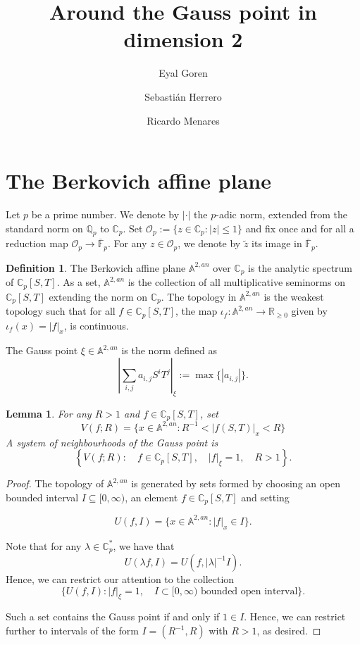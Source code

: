 \documentclass[a4paper,11pt]{amsart}
\title{Around the Gauss point in dimension 2}
\author{Eyal Goren}
\author{Sebasti\'an Herrero}
\author{Ricardo Menares}
\newcommand{\Fpbar}{\overline{\mathbb{F}}_p}
\newcommand{\ce}{\mathbb{C}}
\newcommand{\erre}{\mathbb{R}}
\newcommand{\q}{\mathbb{Q}}
\newcommand{\Aan}{\mathbb{A}^{2,an}}
\newcommand{\Oo}{\mathcal{O}}
\newtheorem{lema}[thm]{Lemma}
\theoremstyle{definition}
\newtheorem{definicion}[thm]{Definition}
\begin{document}
\maketitle

\tableofcontents

\section{The Berkovich affine plane}

Let $p$ be a prime number. We denote by $|\cdot|$ the $p$-adic norm, extended from the standard norm on $\q_p$ to $\ce_p$. Set $\Oo_p:=\{ z \in \ce_p : |z|\leq 1\}$ and fix once and for all a reduction map $\Oo_p\rightarrow \Fpbar$. For any $z\in \Oo_p$, we denote by $\tilde{z}$ its image in $\Fpbar$.

\begin{definicion}
The Berkovich affine plane $\Aan$ over $\ce_p$ is the analytic spectrum of $\ce_p[S,T]$. As a set, $\Aan$ is the collection of all multiplicative seminorms on $\ce_p[S,T]$ extending the norm on $\ce_p$. The topology in $\Aan$ is the weakest topology such that for all $f\in \ce_p[S,T]$, the map $\iota_f : \Aan \rightarrow \erre_{\geq 0}$ given by $\iota_f(x)=|f|_x$, is continuous.

The Gauss point $\xi \in \Aan$ is the norm defined as $$\left| \sum_{i,j}a_{i,j}S^iT^j\right|_\xi := \max\{|a_{i,j}|\}.$$ 
\end{definicion}


\begin{lema}\label{vecindades}
For any $R>1$ and $f\in \ce_p[S,T]$, set $$V(f;R)=\{ x \in \Aan : R^{-1}<|f(S,T)|_x<R\}$$
A system of neighbourhoods of the Gauss point is $$\left\{V(f;R) : \quad f \in \ce_p[S,T], \quad |f|_\xi=1, \quad  R> 1\right\}.$$
\end{lema}

\begin{proof}
The topology of $\Aan$ is generated by sets formed by choosing an open bounded interval $I\subseteq [0,\infty)$, an element $f\in \ce_p[S,T]$ and setting

$$U(f,I)=\{ x \in \Aan : |f|_x \in I \}.$$ 

Note that for any $\lambda \in \ce_p^*$, we have that $$U(\lambda f,I)=U(f,|\lambda|^{-1}I).$$ Hence, we can restrict our attention to the collection
$$\{U(f,I) : |f|_\xi=1, \quad I\subset [0,\infty) \textrm{ bounded open interval}\}.$$ 

Such a set contains the Gauss point if and only if $1\in I$. Hence, we can restrict further to intervals of the form $I=(R^{-1},R)$ with $R>1$, as desired. 
\end{proof}
\end{document}
